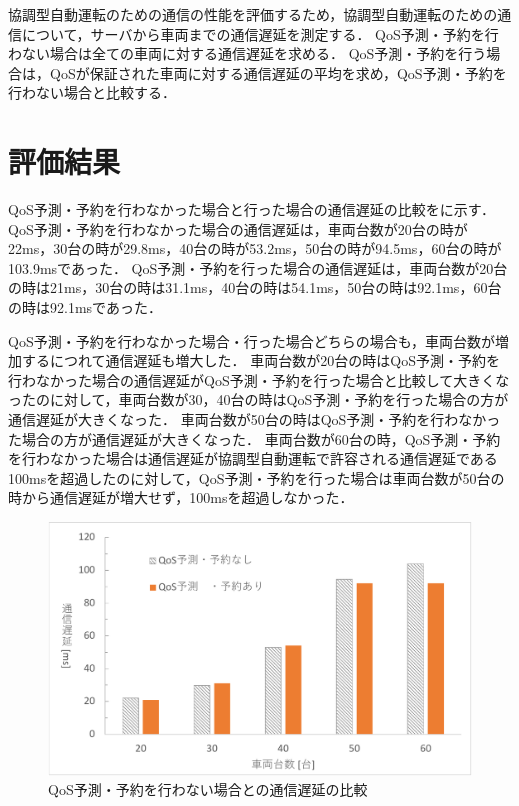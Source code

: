 \documentclass[a4paper,11pt,uplatex]{ujreport}
\begin{document}
  協調型自動運転のための通信の性能を評価するため，協調型自動運転のための通信について，サーバから車両までの通信遅延を測定する．
  QoS予測・予約を行わない場合は全ての車両に対する通信遅延を求める．
  QoS予測・予約を行う場合は，QoSが保証された車両に対する通信遅延の平均を求め，QoS予測・予約を行わない場合と比較する．


\section{評価結果}
\label{sec:評価結果}

  QoS予測・予約を行わなかった場合と行った場合の通信遅延の比較をに示す．
  QoS予測・予約を行わなかった場合の通信遅延は，車両台数が20台の時が22ms，30台の時が29.8ms，40台の時が53.2ms，50台の時が94.5ms，60台の時が103.9msであった．
  QoS予測・予約を行った場合の通信遅延は，車両台数が20台の時は21ms，30台の時は31.1ms，40台の時は54.1ms，50台の時は92.1ms，60台の時は92.1msであった．\par
  QoS予測・予約を行わなかった場合・行った場合どちらの場合も，車両台数が増加するにつれて通信遅延も増大した．
  車両台数が20台の時はQoS予測・予約を行わなかった場合の通信遅延がQoS予測・予約を行った場合と比較して大きくなったのに対して，車両台数が30，40台の時はQoS予測・予約を行った場合の方が通信遅延が大きくなった．
  車両台数が50台の時はQoS予測・予約を行わなかった場合の方が通信遅延が大きくなった．
  車両台数が60台の時，QoS予測・予約を行わなかった場合は通信遅延が協調型自動運転で許容される通信遅延である100msを超過したのに対して，QoS予測・予約を行った場合は車両台数が50台の時から通信遅延が増大せず，100msを超過しなかった．
  
  \begin{figure}[tb]
    \centering
    \includegraphics[width=\linewidth]{img/QoS予測・予約を行わない場合との通信遅延の比較.pdf}
    \caption{QoS予測・予約を行わない場合との通信遅延の比較}
    \label{fig:delay}
  \end{figure}
\end{document}
